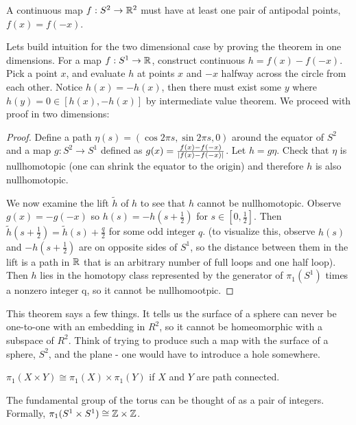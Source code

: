 \documentclass[10pt]{article}
\begin{document}
\begin{theorem}
	A continuous map $f: S^2 \to \mathbb{R}^2$ must have at least one pair of antipodal points, $f(x) = f(-x)$.
\end{theorem}

Lets build intuition for the two dimensional case by proving the theorem in one dimensions. For a map $f: S^1 \to \mathbb{R}$, construct continuous $h = f(x) - f(-x)$. Pick a point $x$, and evaluate $h$ at points $x$ and $-x$ halfway across the circle from each other. Notice $h(x) = -h(x)$, then there must exist some $y$ where $h(y) = 0 \in [h(x), -h(x)]$ by intermediate value theorem. We proceed with proof in two dimensions:

\begin{proof}
	Define a path $\eta(s) = (\cos 2\pi s, \sin 2\pi s, 0)$ around the equator of $S^2$ and a map $g: S^2 \to S^1$ defined as $g(x) = \frac{f(x) - f(-x)}{\lvert f(x) - f(-x)\rvert}$. Let $h = g\eta$. Check that $\eta$ is nullhomotopic (one can shrink the equator to the origin) and therefore $h$ is also nullhomotopic. 

	\indent We now examine the lift $\tilde{h}$ of $h$ to see that $h$ cannot be nullhomotopic. Observe $g(x) = -g(-x)$ so $h(s) = -h(s + \frac 1 2)$ for $s \in [0, \frac 1 2]$. Then $\tilde{h}(s + \frac 1 2) = \tilde{h}(s) + \frac q 2$ for some odd integer $q$. (to visualize this, observe $h(s)$ and $-h(s + \frac 1 2)$ are on opposite sides of $S^1$, so the distance between them in the lift is a path in $\mathbb{R}$ that is an arbitrary number of full loops and one half loop). Then $h$ lies in the homotopy class represented by the generator of $\pi_1(S^1)$ times a nonzero integer q, so it cannot be nullhomootpic.
\end{proof}

This theorem says a few things. It tells us the surface of a sphere can never be one-to-one with an embedding in $R^2$, so it cannot be homeomorphic with a subspace of $R^2$. Think of trying to produce such a map with the surface of a sphere, $S^2$, and the plane - one would have to introduce a hole somewhere.


\begin{theorem}
	$\pi_1(X \times Y) \cong \pi_1(X) \times \pi_1(Y)$ if $X$ and $Y$ are path connected.
\end{theorem}

\begin{example}[Torus]
	The fundamental group of the torus can be thought of as a pair of integers. Formally, $\pi_1(S^1 \times S^1) \cong \mathbb{Z} \times \mathbb{Z}$. 
\end{example}
\end{document}
